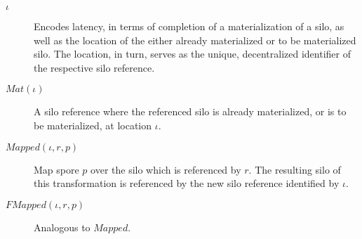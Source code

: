 \documentclass{article}
\theoremstyle{definition}
\begin{document}
\begin{description}
\item[$\iota$] Encodes latency, in terms of completion of a materialization of a silo, as well as the location of the either already materialized or to be materialized silo. The location, in turn, serves as the unique, decentralized identifier of the respective silo reference.

%
%   
%   

\item[$Mat(\iota)$] A silo reference where the referenced silo is already materialized, or is to be materialized, at location $\iota$.

\item[$Mapped(\iota, r, p)$] Map spore $p$ over the silo which is referenced by $r$. The resulting silo of this transformation is referenced by the new silo reference identified by $\iota$. 

%

\item[$FMapped(\iota, r, p)$] Analogous to $Mapped$.
\end{description}
\end{document}
